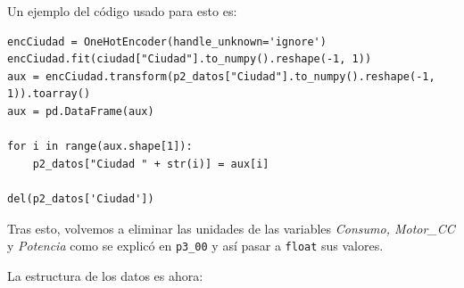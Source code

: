 \documentclass[a4]{article}
\begin{document}
Un ejemplo del código usado para esto es:

\begin{lstlisting}
encCiudad = OneHotEncoder(handle_unknown='ignore')
encCiudad.fit(ciudad["Ciudad"].to_numpy().reshape(-1, 1))
aux = encCiudad.transform(p2_datos["Ciudad"].to_numpy().reshape(-1, 1)).toarray()
aux = pd.DataFrame(aux)

for i in range(aux.shape[1]):
    p2_datos["Ciudad " + str(i)] = aux[i]
    
del(p2_datos['Ciudad'])
\end{lstlisting}

Tras esto, volvemos a eliminar las unidades de las variables \textit{Consumo, Motor\_CC} y \textit{Potencia} como se explicó en \texttt{p3\_00} y así pasar a \texttt{float} sus valores.

La estructura de los datos es ahora:
\end{document}
